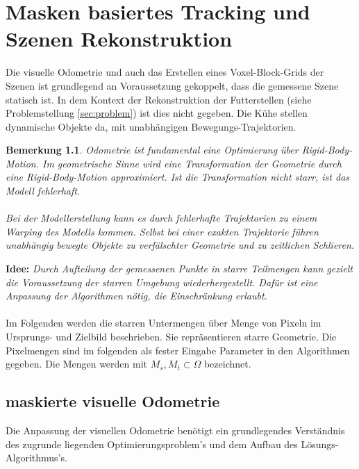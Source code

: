 \documentclass[12pt,DIV=15,BCOR=15mm,twoside,headsepline,abstract=true,listof=totoc,bibliography=totoc]{scrreprt}
\newtheorem{remark}{Bemerkung}[chapter]
\theoremstyle{remark}    %
\begin{document}
    \chapter{Masken basiertes Tracking und Szenen Rekonstruktion} \label{kap:maskout}
    Die visuelle Odometrie und auch das Erstellen eines Voxel-Block-Grids der Szenen ist grundlegend an Voraussetzung gekoppelt, dass die gemessene Szene statisch ist. 
    In dem Kontext der Rekonstruktion der Futterstellen (siehe Problemstellung \ref{sec:problem}) ist dies nicht gegeben. Die Kühe stellen dynamische Objekte da, mit unabhängigen
    Bewegungs-Trajektorien.
    \begin{remark}\noindent
    Odometrie ist fundamental eine Optimierung über Rigid-Body-Motion. Im geometrische Sinne wird eine Transformation
    der Geometrie durch eine Rigid-Body-Motion approximiert. Ist die Transformation nicht starr, ist das Modell fehlerhaft.\\\\
    Bei der Modellerstellung kann es durch fehlerhafte Trajektorien zu einem Warping des Modells kommen. Selbst bei einer exakten 
    Trajektorie führen unabhängig bewegte Objekte zu verfälschter Geometrie und zu zeitlichen Schlieren.
    \end{remark}\noindent
    \textbf{Idee:} \emph{Durch Aufteilung der gemessenen Punkte in starre Teilmengen kann gezielt die Voraussetzung der starren Umgebung wiederhergestellt.
    Dafür ist eine Anpassung der Algorithmen nötig, die Einschränkung erlaubt.}\\\\
    Im Folgenden werden die starren Untermengen über Menge von Pixeln im Ursprungs- und Zielbild beschrieben. Sie repräsentieren starre Geometrie. 
    Die Pixelmengen sind im folgenden als fester Eingabe Parameter in den Algorithmen gegeben. Die Mengen werden mit $M_s, M_t \subset \Omega$ bezeichnet.

    \section{maskierte visuelle Odometrie}
    Die Anpassung der visuellen Odometrie benötigt ein grundlegendes Verständnis des zugrunde liegenden Optimierungsproblem's  und dem Aufbau des 
    Lösungs-Algorithmus's.
\end{document}

